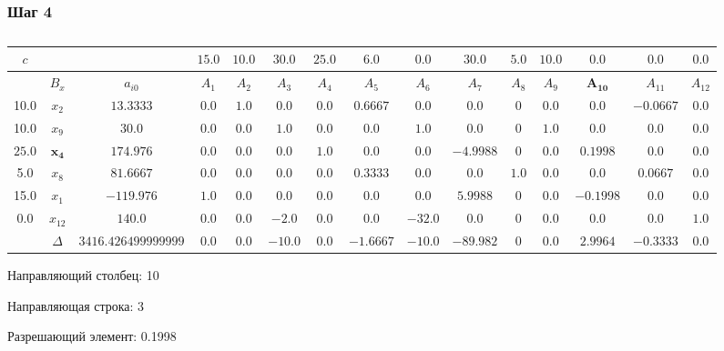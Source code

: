 \begin{landscape}

\subsubsection{Шаг 4}

\begin{table}[H]
	\centering
	\normalsize
	\caption{}
	\label{tbl:1}
	\begin{tabular}{|c|c|c|c|c|c|c|c|c|c|c|c|c|c|c|}
		\hline
		$c$&&&$15.0$&$10.0$&$30.0$&$25.0$&$6.0$&$0.0$&$30.0$&$5.0$&$10.0$&$0.0$&$0.0$&$0.0$\\ \hline
		&$B_x$&$a_{i0}$&$A_{1}$&$A_{2}$&$A_{3}$&$A_{4}$&$A_{5}$&$A_{6}$&$A_{7}$&$A_{8}$&$A_{9}$&$\mathbf{A_{10}}$&$A_{11}$&$A_{12}$\\ \hline
		10.0&$x_{2}$&$13.3333$&$0.0$&$1.0$&$0.0$&$0.0$&$0.6667$&$0.0$&$0.0$&$0$&$0.0$&$0.0$&$-0.0667$&$0.0$\\ \hline
		10.0&$x_{9}$&$30.0$&$0.0$&$0.0$&$1.0$&$0.0$&$0.0$&$1.0$&$0.0$&$0$&$1.0$&$0.0$&$0.0$&$0.0$\\ \hline
		$25.0$&$\mathbf{x_{4}}$&$174.976$&$0.0$&$0.0$&$0.0$&$1.0$&$0.0$&$0.0$&$-4.9988$&$0$&$0.0$&$\mathbf{0.1998}$&$0.0$&$0.0$\\ \hline
		5.0&$x_{8}$&$81.6667$&$0.0$&$0.0$&$0.0$&$0.0$&$0.3333$&$0.0$&$0.0$&$1.0$&$0.0$&$0.0$&$0.0667$&$0.0$\\ \hline
		15.0&$x_{1}$&$-119.976$&$1.0$&$0.0$&$0.0$&$0.0$&$0.0$&$0.0$&$5.9988$&$0$&$0.0$&$-0.1998$&$0.0$&$0.0$\\ \hline
		0.0&$x_{12}$&$140.0$&$0.0$&$0.0$&$-2.0$&$0.0$&$0.0$&$-32.0$&$0.0$&$0$&$0.0$&$0.0$&$0.0$&$1.0$\\ \hline
		&$\Delta$&$3416.426499999999$&$0.0$&$0.0$&$-10.0$&$0.0$&$-1.6667$&$-10.0$&$-89.982$&$0$&$0.0$&$2.9964$&$-0.3333$&$0.0$\\ \hline

\end{tabular}

\end{table}

Направляющий столбец: 10

Направляющая строка: 3

Разрешающий элемент: 0.1998

\end{landscape}

